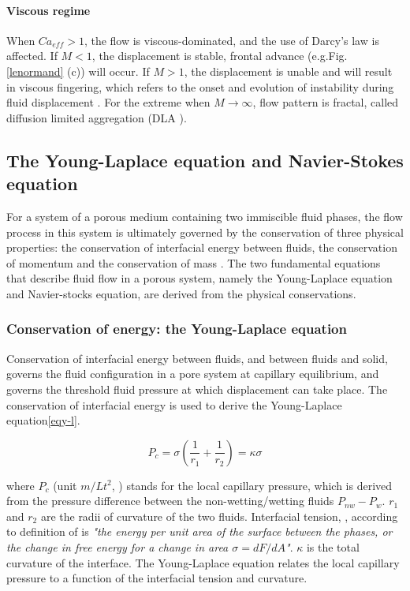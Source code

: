 \paragraph{Viscous regime}
When $Ca_{eff}>1$, the flow is viscous-dominated, and the use of Darcy's law is affected. If $M<1$, the displacement is stable, frontal advance (e.g.Fig.\ref{lenormand} (c)) will occur. If $M>1$, the displacement is unable and will result in viscous fingering, which refers to the onset and evolution of instability during fluid displacement \citep{homsy1987viscous}. For the extreme when $M \rightarrow \infty$, flow pattern is fractal, called diffusion limited aggregation (DLA \citep{witten1981diffusion}).

\subsection{The Young-Laplace equation and Navier-Stokes equation}
For a system of a porous medium containing two immiscible fluid phases, the flow process in this system is ultimately governed by the conservation of three physical properties: the conservation of interfacial energy between fluids, the conservation of momentum and the conservation of mass \citep{blunt2017multiphase}. The two fundamental equations that describe fluid flow in a porous system, namely the Young-Laplace equation and Navier-stocks equation, are derived from the physical conservations.

\subsubsection{Conservation of energy: the Young-Laplace equation}
Conservation of interfacial energy between fluids, and between fluids and solid, governs the fluid configuration in a pore system at capillary equilibrium, and governs the threshold fluid pressure at which displacement can take place. The conservation of interfacial energy is used to derive the Young-Laplace equation\ref{eqy-l}. 

\begin{equation}\label{eqy-l}
    P_{c}=\sigma(\frac{1}{r_{1}}+\frac{1}{r_{2}})=\kappa \sigma
\end{equation}

where $P_{c}$ (unit $m/Lt^2$, \textpsi ) stands for the local capillary pressure, which is derived from the pressure difference between the non-wetting/wetting fluids $P_{nw}-P_{w}$. $r_{1}$ and $r_{2}$ are the radii of curvature of the two fluids. Interfacial tension, \textsigma, according to definition of \citet{blunt2017multiphase} is \textit{"the energy per unit area of the surface between the phases, or the change in free energy for a change in area $\sigma=dF/dA$"}. $\kappa$ is the total curvature of the interface. The Young-Laplace equation relates the local capillary pressure to a function of the interfacial tension and curvature.

